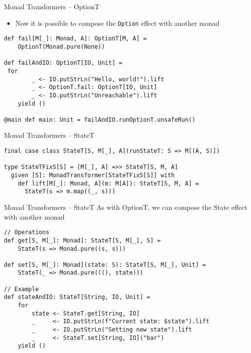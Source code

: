 \documentclass[presentation, 10pt]{beamer}\mode<presentation>{\usetheme{AMSBolognaFC}}
\begin{document}
\begin{frame}[fragile]{Monad Transformers -- OptionT}
\begin{itemize}
	\item Now it is possible to compose the \texttt{Option} effect with another monad
\end{itemize}
\begin{tcolorbox}
\begin{verbatim}
def fail[M[_]: Monad, A]: OptionT[M, A] = 
	OptionT(Monad.pure(None)) 

def failAndIO: OptionT[IO, Unit] = 
 for 
 		_ <- IO.putStrLn("Hello, world!").lift 
		_ <- OptionT.fail: OptionT[IO, Unit] 
		_ <- IO.putStrLn("Unreachable").lift 
	yield ()	

@main def main: Unit = failAndIO.runOptionT.unsafeRun()
\end{verbatim}
\end{tcolorbox}
\end{frame}
\begin{frame}[fragile]{Monad Transformers -- StateT}
\begin{center}	
\begin{verbatim}
final case class StateT[S, M[_], A](runStateT: S => M[(A, S)])

type StateTFixS[S] = [M[_], A] =>> StateT[S, M, A]
  given [S]: MonadTransformer[StateTFixS[S]] with
    def lift[M[_]: Monad, A](m: M[A]): StateT[S, M, A] =
      StateT(s => m.map((_, s)))
\end{verbatim}
\end{center}
\end{frame}
\begin{frame}[fragile]{Monad Transformers -- StateT}
As with OptionT, we can compose the State effect with another monad
\begin{tcolorbox}
\begin{verbatim}
// Operations
def get[S, M[_]: Monad]: StateT[S, M[_], S] =
	StateT(s => Monad.pure((s, s)))

def set[S, M[_]: Monad](state: S): StateT[S, M[_], Unit] =
	StateT(_ => Monad.pure(((), state)))

// Example
def stateAndIO: StateT[String, IO, Unit] =
	for
		state <- StateT.get[String, IO]
		_     <- IO.putStrLn(f"Current state: $state").lift
		_     <- IO.putStrLn("Setting new state").lift
		_     <- StateT.set[String, IO]("bar")
	yield ()
\end{verbatim}
\end{tcolorbox}
\end{frame}
\end{document}
